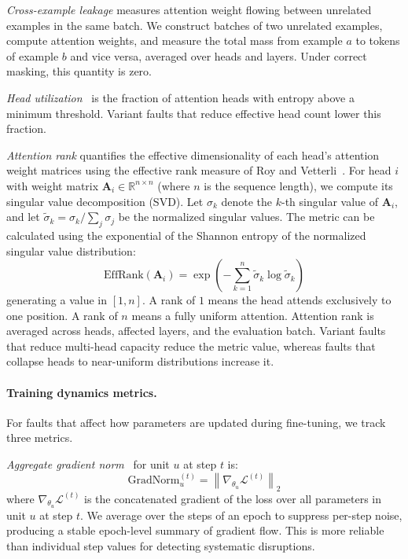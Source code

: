 \emph{Cross-example leakage} measures attention weight flowing between unrelated examples in the same batch. We construct batches of two unrelated examples, compute attention weights, and measure the total mass from example $a$ to tokens of example $b$ and vice versa, averaged over heads and layers. Under correct masking, this quantity is zero.

\emph{Head utilization}~\citep{voita2019analyzing,michel2019sixteen} is the fraction of attention heads with entropy above a minimum threshold. Variant faults that reduce effective head count lower this fraction.

\emph{Attention rank} quantifies the effective dimensionality of each head's attention weight matrices using the effective rank measure of Roy and Vetterli~\citep{roy2007effective}. For head $i$ with weight matrix $\mathbf{A}_i \in \mathbb{R}^{n \times n}$ (where $n$ is the sequence length), we compute its singular value decomposition (SVD). Let $\sigma_k$ denote the $k$-th singular value of $\mathbf{A}_i$, and let $\tilde{\sigma}_k = \sigma_k / \sum_j \sigma_j$ be the normalized singular values. The metric can be calculated using the exponential of the Shannon entropy of the normalized singular value distribution:
\begin{equation}
  \mathrm{EffRank}(\mathbf{A}_i) = \exp\!\left(-\sum_{k=1}^{n} \tilde{\sigma}_k \log \tilde{\sigma}_k\right)
  \label{eq:effrank}
\end{equation}
generating a value in $[1, n]$. A rank of $1$ means the head attends exclusively to one position. A rank of $n$ means a fully uniform attention. Attention rank is averaged across heads, affected layers, and the evaluation batch. Variant faults that reduce multi-head capacity reduce the metric value, whereas faults that collapse heads to near-uniform distributions increase it.

\paragraph{Training dynamics metrics.}
For faults that affect how parameters are updated during fine-tuning, we track three metrics.

\emph{Aggregate gradient norm}~\citep{pascanu2013difficulty} for unit $u$ at step $t$ is:
\begin{equation}
\mathrm{GradNorm}_u^{(t)} = \left\|\nabla_{\theta_u} \mathcal{L}^{(t)}\right\|_2
\label{eq:grad-norm}
\end{equation}
where $\nabla_{\theta_u} \mathcal{L}^{(t)}$ is the concatenated gradient of the loss over all parameters in unit $u$ at step $t$. We average over the steps of an epoch to suppress per-step noise, producing a stable epoch-level summary of gradient flow. This is more reliable than individual step values for detecting systematic disruptions.

